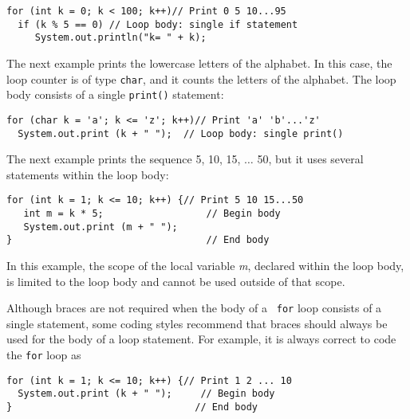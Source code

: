 \begin{jjjlisting}
\begin{lstlisting}
for (int k = 0; k < 100; k++)// Print 0 5 10...95
  if (k % 5 == 0) // Loop body: single if statement
     System.out.println("k= " + k);
\end{lstlisting}
\end{jjjlisting}

\noindent The next example prints the lowercase letters of the
alphabet.  In this case, the loop counter is of type {\tt char},
and it counts the letters of the alphabet.  The loop body
consists of a single {\tt print()} statement:

\begin{jjjlisting}
\begin{lstlisting}
for (char k = 'a'; k <= 'z'; k++)// Print 'a' 'b'...'z'
  System.out.print (k + " ");  // Loop body: single print()
\end{lstlisting}
\end{jjjlisting}


\noindent The next example prints the sequence  5, 10, 15, $\dots$ 50,
but it uses several statements within the loop body:


\begin{jjjlisting}
\begin{lstlisting}
for (int k = 1; k <= 10; k++) {// Print 5 10 15...50
   int m = k * 5;                  // Begin body
   System.out.print (m + " ");
}                                  // End body
\end{lstlisting}
\end{jjjlisting}

\noindent In this example, the scope of the local variable {\it m},
declared within the loop body, is limited to the loop body and
cannot be used outside of that scope.


\noindent Although braces are not required when the body of a {\tt
for} loop consists of a single statement, some coding styles recommend
that braces should always be used for the body of a loop statement.
For example, it is always correct to code the {\tt for} loop as

\begin{jjjlisting}
\begin{lstlisting}
for (int k = 1; k <= 10; k++) {// Print 1 2 ... 10
  System.out.print (k + " ");     // Begin body
}                                // End body
\end{lstlisting}
\end{jjjlisting}

